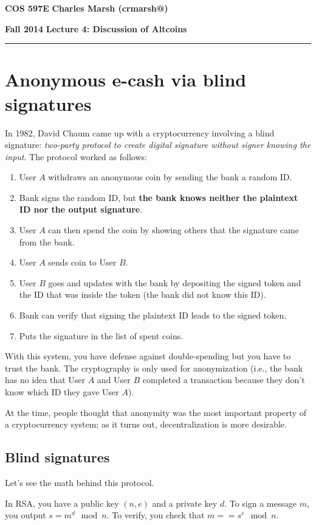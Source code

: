 \documentclass[12pt]{article}
\makeatletter
\newcommand{\myheader}[4]
{\vspace*{-0.5in}
\noindent
{#1} \hfill {#3}

\noindent
{#2} \hfill {#4}

\noindent
\rule[8pt]{\textwidth}{1pt}

\vspace{1ex} 
}  %
\newcommand{\myalgsheader}[0]
{\myheader
{ {\bf{COS 597E}} }
{ {\bf{Fall 2014}} }
{ {\bf{Charles Marsh (crmarsh@)}} }
{ {\bf{Lecture 4: Discussion of Altcoins}} }
}
\makeatother
\begin{document}
\myalgsheader

\pagestyle{plain}

\section*{Anonymous e-cash via blind signatures}

In 1982, David Chaum came up with a cryptocurrency involving a blind signature: \textit{two-party protocol to create digital signature without signer knowing the input}. The protocol worked as follows:

\begin{enumerate}
\item User $A$ withdraws an anonymous coin by sending the bank a random ID.
\item Bank signs the random ID, but \textbf{the bank knows neither the plaintext ID nor the output signature}.
\item User $A$ can then spend the coin by showing others that the signature came from the bank.
\item User $A$ sends coin to User $B$.
\item User $B$ goes and updates with the bank by depositing the signed token and the ID that was inside the token (the bank did not know this ID).
\item Bank can verify that signing the plaintext ID leads to the signed token.
\item Puts the signature in the list of spent coins.
\end{enumerate}

With this system, you have defense against double-spending but you have to trust the bank. The cryptography is only used for anonymization (i.e., the bank has no idea that User $A$ and User $B$ completed a transaction because they don't know which ID they gave User $A$).

At the time, people thought that anonymity was the most important property of a cryptocurrency system; as it turns out, decentralization is more desirable.

\subsection*{Blind signatures}

Let's see the math behind this protocol.

In RSA, you have a public key $(n, e)$ and a private key $d$. To sign a message $m$, you output $s = m^d \mod n$. To verify, you check that $m == s^e \mod n$.
\end{document}
